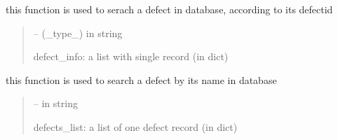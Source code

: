 \documentclass[letterpaper,10pt,english]{sphinxmanual}
\begin{document}
\begin{savenotes}
\begin{fulllineitems}
\begin{savenotes}\begin{fulllineitems}
\label{\detokenize{setting/database_utils:oxin.database_utils.dataBaseUtils.search_defect_by_id}}
\pysigstartsignatures
{}
\pysigstopsignatures
\sphinxAtStartPar
this function is used to serach a defect in database, according to its defect\sphinxhyphen{}id
\begin{quote}\begin{description}
\sphinxAtStartPar
{} – (\_type\_) in string

\sphinxAtStartPar
defect\_info: a list with single record (in dict)

\end{description}\end{quote}

\end{fulllineitems}\end{savenotes}


\begin{savenotes}\begin{fulllineitems}
\label{\detokenize{setting/database_utils:oxin.database_utils.dataBaseUtils.search_defect_by_name}}
\pysigstartsignatures
{}
\pysigstopsignatures
\sphinxAtStartPar
this function is used to search a defect by its name in database
\begin{quote}\begin{description}
\sphinxAtStartPar
{} – in string

\sphinxAtStartPar
defects\_list: a list of one defect record (in dict)

\end{description}\end{quote}

\end{fulllineitems}\end{savenotes}


\end{fulllineitems}
\end{savenotes}
\end{document}
